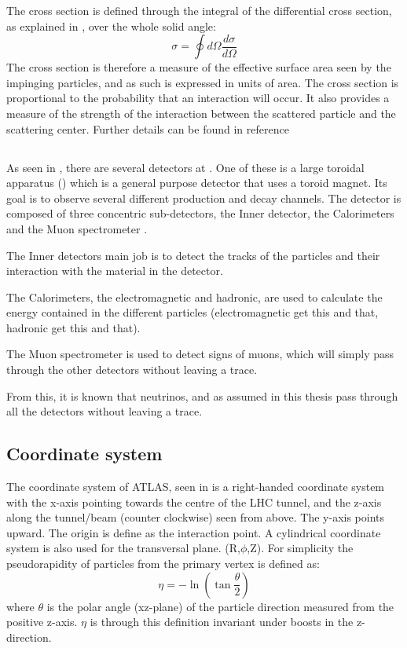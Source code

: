 The cross section is defined through the integral of the differential cross section, as explained in , over the whole solid angle:
\begin{equation}
\sigma = \oint d\Omega \frac{d\sigma}{d\Omega}
\end{equation}
The cross section is therefore a measure of the effective surface area seen by the impinging particles, and as such is expressed in units of area. The cross section is proportional to the probability that an interaction will occur. It also provides a measure of the strength of the interaction between the scattered particle and the scattering center.
Further details can be found in reference~\citep{Herr:2006}

\subsection{\abbrATLAS}
As seen in , there are several detectors at \abbrCERN. One of these is a large toroidal \abbrLHC apparatus (\abbrATLAS) which is a general purpose detector that uses a toroid magnet. Its goal is to observe several different production and decay channels. The detector is composed of three concentric sub-detectors, the Inner detector, the Calorimeters and the Muon spectrometer \citep{1129811}.

The Inner detectors main job is to detect the tracks of the particles and their interaction with the material in the detector.

The Calorimeters, the electromagnetic and hadronic, are used to calculate the energy contained in the different particles (electromagnetic get this and that, hadronic get this and that). 

The Muon spectrometer is used to detect signs of muons, which will simply pass through the other detectors without leaving a trace.

From this, it is known that neutrinos, and as assumed in this thesis \abbrWIMPS pass through all the detectors without leaving a trace.
\subsection{Coordinate system}\label{sec:eo:subsec:coord}
The coordinate system of ATLAS, seen in  is a right-handed coordinate system with the x-axis pointing towards the centre of the LHC tunnel, and the z-axis along the tunnel/beam (counter clockwise) seen from above. The y-axis points upward.
The origin is define as the interaction point.
A cylindrical coordinate system is also used for the transversal plane. (R,$\phi$,Z).
For simplicity the pseudorapidity of particles from the primary vertex is defined as:
\begin{equation}
\eta = - \ln( \tan\frac{\theta}{2})
\end{equation}
where $\theta$ is the polar angle (xz-plane) of the particle direction measured from the positive z-axis. 
$\eta$ is through this definition invariant under boosts in the z-direction.

